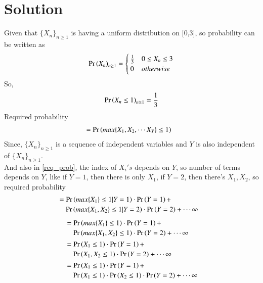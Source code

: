 \documentclass[journal,12pt,twocolumn]{IEEEtran}
\begin{document}
\section{Solution}
Given that $\{X_n\}_{n\ge 1}$ is having a uniform distribution on [0,3], so probability can be written as
\begin{align}
\Pr\left(X_n\right)_{n\ge 1}=  
\begin{cases}
\frac{1}{3} & 0\le X_n\le 3 \\
0 & otherwise
\end{cases}
\end{align}
So,
\begin{align}
    \Pr\left(X_n\le 1\right)_{n\ge 1}=\frac{1}{3}
\end{align}
Required probability
\begin{align}
 &=\Pr\left(max\{X_1,X_2,\cdots X_Y\}\le 1\right)\label{req_prob}
 \end{align}
 Since, $\{X_n\}_{n\ge 1}$ is a sequence of independent variables and $Y$ is also independent of $\{X_n\}_{n\ge 1}$.\\
 And also in \eqref{req_prob}, the index of $X_i's$ depends on $Y$, so number of terms depends on $Y$, like if $Y=1$, then there is only $X_1$, if $Y=2$, then there's $X_1,X_2$, so required probability
 \begin{align}
 & \begin{multlined}
    =\pr{max\{X_1\}\le 1|Y=1}\cdot \pr{Y=1}+\\
    \pr{max\{X_1,X_2\}\le 1|Y=2}\cdot \pr{Y=2}+\cdots \infty 
\end{multlined}
\end{align}
\begin{align}
& \begin{multlined}
    =\pr{max\{X_1\}\le 1}\cdot \pr{Y=1}+\\
    \pr{max\{X_1,X_2\}\le 1}\cdot \pr{Y=2}+\cdots \infty 
\end{multlined}\\
&\begin{multlined}
    =\pr{X_1\le 1}\cdot \pr{Y=1}+\\
    \pr{X_1,X_2\le 1}\cdot\pr{Y=2}+\cdots \infty
\end{multlined}\\
&\begin{multlined}
    =\pr{X_1\le 1}\cdot \pr{Y=1}+\\
    \pr{X_1\le 1}\cdot\pr{X_2\le 1}\cdot\pr{Y=2}+\cdots \infty
\end{multlined}
\end{align}
\end{document}
